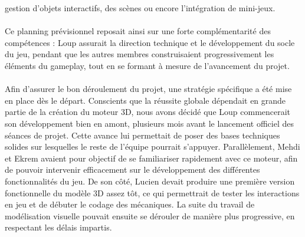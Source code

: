         gestion d’objets interactifs, des scènes ou encore l’intégration de mini-jeux.
        \\ \\
        Ce planning prévisionnel reposait ainsi sur une forte complémentarité des compétences : Loup assurait la direction technique et le développement du socle du jeu, 
        pendant que les autres membres construisaient progressivement les éléments du gameplay, tout en se formant à mesure de l’avancement du projet.
        \\ \\
        Afin d’assurer le bon déroulement du projet, une stratégie spécifique a été mise en place dès le départ. Conscients que la réussite globale dépendait en grande 
        partie de la création du moteur 3D, nous avons décidé que Loup commencerait son développement bien en amont, plusieurs mois avant le lancement officiel des séances 
        de projet. Cette avance lui permettait de poser des bases techniques solides sur lesquelles le reste de l’équipe pourrait s’appuyer. Parallèlement, Mehdi et Ekrem 
        avaient pour objectif de se familiariser rapidement avec ce moteur, afin de pouvoir intervenir efficacement sur le développement des différentes fonctionnalités du 
        jeu. De son côté, Lucien devait produire une première version fonctionnelle du modèle 3D assez tôt, ce qui permettrait de tester les interactions en jeu et de 
        débuter le codage des mécaniques. La suite du travail de modélisation visuelle pouvait ensuite se dérouler de manière plus progressive, en respectant les délais 
        impartis.



